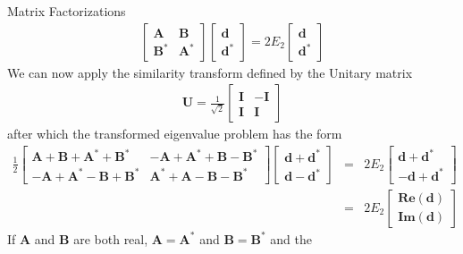 \documentclass[10pt]{beamer}
\begin{document}
{{{{{{{{{{{{{{{{{\begin{frame}{Matrix Factorizations}
  \vspace{-6mm}
  \begin{eqnarray*}
    \begin{bmatrix}
      \mathbf{A} & \mathbf{B} \\
      \mathbf{B^*} & \mathbf{A^*} 
    \end{bmatrix}
    \begin{bmatrix}
      \mathbf{d} \\
      \mathbf{d^*} 
    \end{bmatrix}
    = 2E_2
    \begin{bmatrix}
      \mathbf{d} \\
      \mathbf{d^*} 
    \end{bmatrix}
  \end{eqnarray*}
  We can now apply the similarity transform defined by the Unitary matrix 
  \begin{eqnarray*}
    \mathbf{U} = \frac{1}{\sqrt{2}}
    \begin{bmatrix}
      \mathbf{I} & -\mathbf{I} \\
      \mathbf{I} & \mathbf{I} 
    \end{bmatrix}
  \end{eqnarray*}
  after which the transformed eigenvalue problem has the form
  \begin{eqnarray*}
    \frac{1}{2}
    \begin{bmatrix}
      \mathbf{A + B + A^* + B^*} & \mathbf{-A + A^* + B - B^*} \\
      \mathbf{-A + A^* - B + B^*} & \mathbf{A^* + A - B - B^*} 
    \end{bmatrix}
    \begin{bmatrix}
      \mathbf{d + d^*} \\
      \mathbf{d - d^*} 
    \end{bmatrix}
    &=& 2E_2
    \begin{bmatrix}
      \mathbf{d + d^*} \\
      \mathbf{-d + d^*} 
    \end{bmatrix} \\
    &=& 2E_2
    \begin{bmatrix}
      \mathbf{Re(d)} \\
      \mathbf{Im(d)} 
    \end{bmatrix}
  \end{eqnarray*}
  If $\mathbf{A}$ and $\mathbf{B}$ are both real, $\mathbf{A = A^*}$ and $\mathbf{B = B^*}$ and the 

\end{frame}}}}}}}}}}}}}}}}}}
\end{document}
